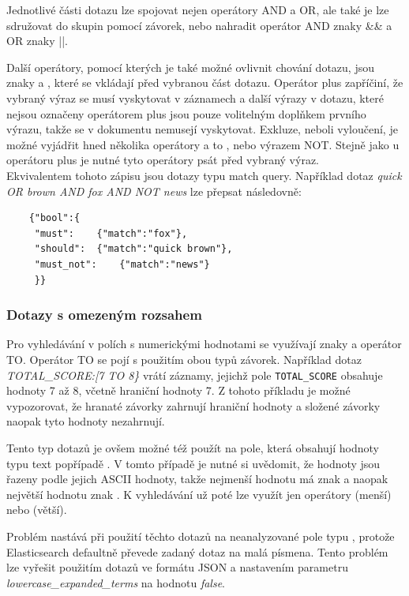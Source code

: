 \documentclass[czech,BP]{thesiskiv}
\begin{document}
Jednotlivé části dotazu lze spojovat nejen operátory AND a OR, ale také je lze sdružovat do skupin pomocí závorek, nebo nahradit operátor AND znaky \&\& a OR znaky ||.


Další operátory, pomocí kterých je také možné ovlivnit chování dotazu, jsou znaky \uv{+} a \uv{-}, které se vkládají před vybranou část dotazu. Operátor plus zapříčiní, že vybraný výraz se musí vyskytovat v záznamech a další výrazy v dotazu, které nejsou označeny operátorem plus jsou pouze volitelným doplňkem prvního výrazu, takže se v dokumentu nemusejí vyskytovat. Exkluze, neboli vyloučení, je možné vyjádřit hned několika operátory a to \uv{-}, \uv{!} nebo výrazem NOT. Stejně jako u operátoru plus je nutné tyto operátory psát před vybraný výraz.
\\
Ekvivalentem tohoto zápisu jsou dotazy typu match query. Například dotaz \textit{quick OR brown AND fox AND NOT news} lze přepsat následovně:
			

	\begin{lstlisting}
	{"bool":{
	 "must":	{"match":"fox"},
	 "should":	{"match":"quick brown"},
	 "must_not":	{"match":"news"}
	 }}
	\end{lstlisting}
	
\subsubsection{Dotazy s omezeným rozsahem}	
Pro vyhledávání v polích s numerickými hodnotami se využívají znaky \uv{\{\}, [], <, >, =}  a operátor TO. Operátor TO se pojí s použitím obou typů závorek. Například dotaz \textit{TOTAL\_SCORE:[7 TO 8\}} vrátí záznamy, jejichž pole \texttt{TOTAL\_SCORE} obsahuje hodnoty 7 až 8, včetně hraniční hodnoty 7. Z tohoto příkladu je možné vypozorovat, že hranaté závorky zahrnují hraniční hodnoty a složené závorky naopak tyto hodnoty nezahrnují.


Tento typ dotazů je ovšem možné též použít na pole, která obsahují hodnoty typu text popřípadě . V tomto případě je nutné si uvědomit, že hodnoty jsou řazeny podle jejich ASCII hodnoty, takže nejmenší hodnotu má znak  a naopak největší hodnotu znak . K vyhledávání už poté lze využít jen operátory \uv{<} (menší) nebo \uv{>} (větší).


Problém nastává při použití těchto dotazů na neanalyzované pole typu , protože Elasticsearch defaultně převede zadaný dotaz na malá písmena. Tento problém lze vyřešit použitím dotazů ve formátu JSON a nastavením parametru \textit{lowercase\_expanded\_terms} na hodnotu \textit{false}.
\end{document}
